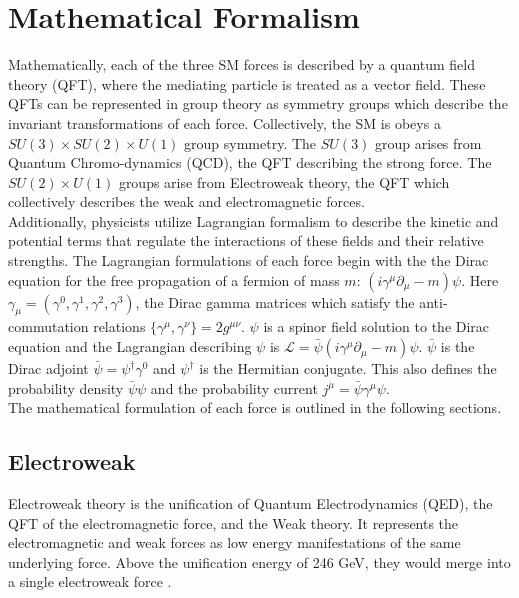 \section{Mathematical Formalism}
Mathematically, each of the three SM forces is described by a quantum field theory (QFT), where the mediating particle is treated as a vector field. These QFTs can be represented in group theory as symmetry groups which describe the invariant transformations of each force. Collectively, the SM is obeys a $SU(3)\times SU(2)\times U(1)$ group symmetry. The $SU(3)$ group arises from Quantum Chromo-dynamics (QCD), the QFT describing the strong force. The $SU(2)\times U(1)$ groups arise from Electroweak theory, the QFT which collectively describes the weak and electromagnetic forces.\\

Additionally, physicists utilize Lagrangian formalism to describe the kinetic and potential terms that regulate the interactions of these fields and their relative strengths. The Lagrangian formulations of each force begin with the the Dirac equation for the free propagation of a fermion of mass $m$: $(i\gamma^{\mu}\partial_{\mu}-m)\psi$. Here $\gamma_{\mu}=(\gamma^0,\gamma^1,\gamma^2,\gamma^3)$, the Dirac gamma matrices which satisfy the anti-commutation relations $\{\gamma^{\mu},\gamma^{\nu}\}=2g^{\mu\nu}$. $\psi$ is a spinor field solution to the Dirac equation and the Lagrangian describing $\psi$ is $\mathcal{L}=\bar{\psi}(i\gamma^{\mu}\partial_{\mu}-m)\psi$. $\bar{\psi}$ is the Dirac adjoint $\bar{\psi}=\psi^{\dagger}\gamma^0$ and $\psi^{\dagger}$ is the Hermitian conjugate. This also defines the probability density $\bar{\psi}\psi$ and the probability current $j^{\mu}=\bar{\psi} \gamma^{\mu}\psi$.\\

The mathematical formulation of each force is outlined in the following sections.\\

\subsection{Electroweak}
Electroweak theory is the unification of Quantum Electrodynamics (QED), the QFT of the electromagnetic force, and the Weak theory. It represents the electromagnetic and weak forces as low energy manifestations of the same underlying force. Above the unification energy of 246 GeV, they would merge into a single electroweak force \cite{unification}.

